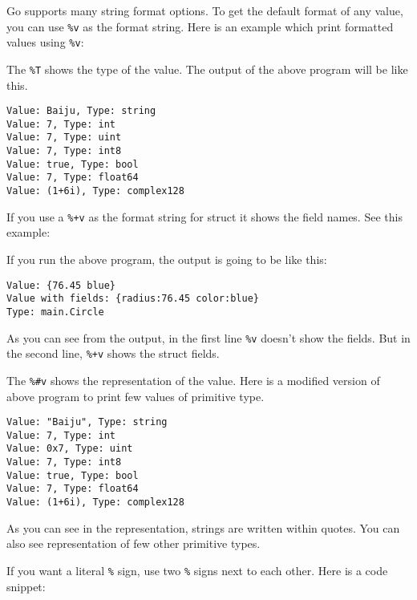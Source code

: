 Go supports many string format options.  To
get the default format of any value, you can use \texttt{\%v} as the
format string.  Here is an example which print formatted values
using \texttt{\%v}:



The \texttt{\%T} shows the type of the value.  The output of the above
program will be like this.

\begin{lstlisting}[numbers=none]
Value: Baiju, Type: string
Value: 7, Type: int
Value: 7, Type: uint
Value: 7, Type: int8
Value: true, Type: bool
Value: 7, Type: float64
Value: (1+6i), Type: complex128
\end{lstlisting}

If you use a \texttt{\%+v} as the format string for struct it shows
the field names.  See this example:



If you run the above program, the output is going to be like this:

\begin{lstlisting}[numbers=none]
Value: {76.45 blue}
Value with fields: {radius:76.45 color:blue}
Type: main.Circle
\end{lstlisting}

As you can see from the output, in the first line \texttt{\%v} doesn't
show the fields.  But in the second line, \texttt{\%+v} shows the
struct fields.

The \texttt{\%\#v} shows the representation of the value. Here is a
modified version of above program to print few values of primitive
type.



\begin{lstlisting}[numbers=none]
Value: "Baiju", Type: string
Value: 7, Type: int
Value: 0x7, Type: uint
Value: 7, Type: int8
Value: true, Type: bool
Value: 7, Type: float64
Value: (1+6i), Type: complex128
\end{lstlisting}

As you can see in the representation, strings are written within
quotes.  You can also see representation of few other primitive types.

If you want a literal \texttt{\%} sign, use two \texttt{\%} signs next
to each other.  Here is a code snippet:

